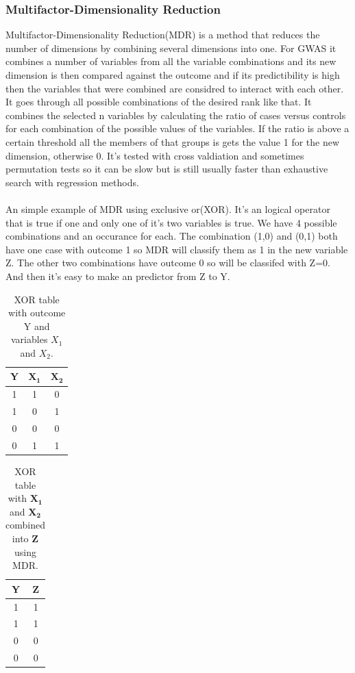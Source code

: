 \documentclass[10pt,a4paper]{article}
\begin{document}
\subsubsection{Multifactor-Dimensionality Reduction}
Multifactor-Dimensionality Reduction(MDR) is a method that reduces the number of dimensions by combining several dimensions into one. For GWAS it combines a number of variables from all the variable combinations and its new dimension is then compared against the outcome and if its predictibility is high then the variables that were combined are considred to interact with each other. It goes through all possible combinations of the desired rank like that. It combines the selected n variables by calculating the ratio of cases versus controls for each combination of the possible values of the variables. If the ratio is above a certain threshold all the members of that groups is gets the value 1 for the new dimension, otherwise 0. It's tested with cross valdiation and sometimes permutation tests so it can be slow but is still usually faster than exhaustive search with regression methods.\cite{cordell_detect_review,mdr_2001}\\
\\
An simple example of MDR using exclusive or(XOR). It's an logical operator that is true if one and only one of it's two variables is true. We have 4 possible combinations and an occurance for each. The combination (1,0) and (0,1) both have one case with outcome 1 so MDR will classify them as 1 in the new variable Z. The other two combinations have outcome 0 so will be classifed with Z=0. And then it's easy to make an predictor from Z to Y.

\begin{table}[h]
\begin{tabular}{ | c | c | c | }
  \hline
  \textbf{Y} & $\mathbf{X_1}$ & $\mathbf{X_2}$ \\
  \hline
  1 & 1 & 0 \\
  \hline 
  1 & 0 & 1 \\
  \hline
  0 & 0 & 0 \\
  \hline
  0 & 1 & 1 \\
  \hline
\end{tabular}
\caption{XOR table with outcome Y and variables $X_1$ and $X_2$.}
\label{table:xor_table}
\end{table}
\begin{table}[h]
\begin{tabular}{ | c | c | }
  \hline
  \textbf{Y} & \textbf{Z} \\
  \hline
  1 & 1 \\
  \hline
  1 & 1 \\
  \hline
  0 & 0 \\
  \hline
  0 & 0 \\
  \hline
\end{tabular}
\caption{XOR table with $\mathbf{X_1}$ and $\mathbf{X_2}$ combined into $\mathbf{Z}$ using MDR.}
\label{table:xor_mdr_table}
\end{table}
\end{document}
